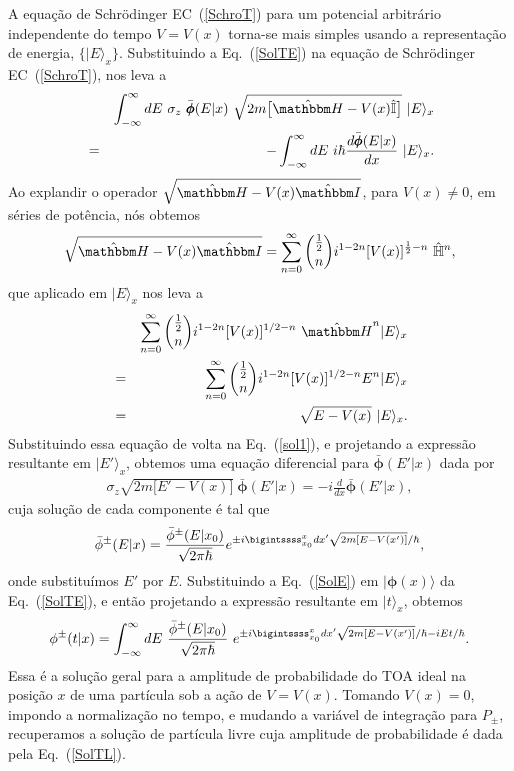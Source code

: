 A equação de Schrödinger EC~(\ref{SchroT}) para um potencial arbitrário independente do tempo $V=V(x)$ torna-se mais simples usando a representação de energia, $\{|E\rangle_x\}$.
 Substituindo a Eq.~(\ref{SolTE}) na equação de Schrödinger EC~(\ref{SchroT}), nos leva a
\begin{eqnarray}\label{sol1}
&&\int_{-\infty}^{\infty} dE~{\sigma}_{z}~{\bar{\pmb{\phi}}}(E|x) ~\sqrt{2m\big[{\hat {\mathbbm H}}-V(x){\hat {\mathbb I}}\big]}~|E\rangle_x\nonumber\\
&=&-\int_{-\infty}^{\infty} dE~i\hbar\frac{d {\bar{\pmb{\phi}}}(E|x)}{dx}~|E\rangle_x.
\end{eqnarray}
Ao explandir o operador $\sqrt{{\hat {\mathbbm H}- V(x){\hat {\mathbbm I}}}}$, para $V(x)\neq 0$, em séries de potência, nós obtemos
\begin{eqnarray}
\sqrt{{\hat {\mathbbm H}}-V(x){\hat {\mathbbm I}}}=\sum_{n=0}^{\infty} {\frac{1}{2}\choose n} i^{1-2n} [V(x)]^{\frac{1}{2}-n}~{\hat {\mathbb H}}^n,
\end{eqnarray}
que aplicado em $|E\rangle_x$ nos leva a
\begin{eqnarray}
&&\sum_{n=0}^{\infty} {\frac{1}{2}\choose n} i^{1-2n} [V(x)]^{1/2-n}~{\hat {\mathbbm H}}^n|E\rangle_x\nonumber\\
&=&\sum_{n=0}^{\infty} {\frac{1}{2}\choose n} i^{1-2n} [V(x)]^{1/2-n}E^n|E\rangle_x\nonumber\\
&=&\sqrt{E-V(x)}~|E\rangle_x.
\end{eqnarray}
Substituindo essa equação de volta na Eq.~(\ref{sol1}), e projetando a expressão resultante em $|E'\rangle_x$, obtemos uma equação diferencial para $\bar{\pmb{\phi}}(E'|x)$ dada por
\begin{eqnarray}
{\sigma}_z\sqrt{2m\big[E'-V(x)\big]}~{\bar{\pmb{\phi}}}(E'|x)=-i\frac{d}{dx}{\bar{\pmb{\phi}}}(E'|x),
\end{eqnarray}
cuja solução de cada componente é tal que
\begin{equation}\label{SolE}
{\bar \phi}^\pm(E|x)=\frac{{\bar \phi}^\pm(E|x_0)}{\sqrt{2\pi \hbar}}e^{{\pm}i \bigintssss_{x_0}^x dx'\sqrt{2m [E-V(x') ]}/\hbar},
\end{equation}
onde substituímos $E'$ por $E$. Substituindo a Eq.~(\ref{SolE}) em $|\pmb{\phi}(x)\rangle$ da Eq.~(\ref{SolTE}), e então projetando a expressão resultante em $|t\rangle_x$, obtemos
\begin{eqnarray}\label{SolTX}
\phi^\pm(t|x)= \int_{-\infty}^{\infty}dE~\frac{{\bar \phi}^\pm(E|x_0)}{\sqrt{2\pi \hbar}}~e^{{\pm}i \bigintssss_{x_0}^x dx'\sqrt{2m [E-V(x') ]}/\hbar-iEt/\hbar}.
\end{eqnarray}
Essa é a solução geral para a amplitude de probabilidade do TOA ideal na posição $x$ de uma partícula sob a ação de $V=V(x)$. Tomando $V(x)=0$, impondo a normalização no tempo, e mudando a variável de integração para $P_\pm$, recuperamos a solução de partícula livre cuja amplitude de probabilidade é dada pela Eq.~(\ref{SolTL}).


